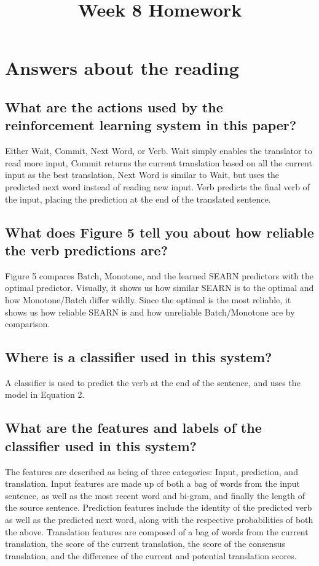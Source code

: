 \documentclass{article}
\title{Week 8 Homework}
\begin{document}
 

\section{Answers about the reading}
\subsection{What are the actions used by the reinforcement learning system in this paper?}
Either Wait, Commit, Next Word, or Verb. Wait simply enables the translator to read more input, Commit returns the current translation based on all the current input as the best translation, Next Word is similar to Wait, but uses the predicted next word instead of reading new input. Verb predicts the final verb of the input, placing the prediction at the end of the translated sentence. 

\subsection{What does Figure 5 tell you about how reliable the verb predictions are?}
Figure 5 compares Batch, Monotone, and the learned SEARN predictors with the optimal predictor. Visually, it shows us how similar SEARN is to the optimal and how Monotone/Batch differ wildly. Since the optimal is the most reliable, it shows us how reliable SEARN is and how unreliable Batch/Monotone are by comparison. 

\subsection{Where is a classifier used in this system?}
A classifier is used to predict the verb at the end of the sentence, and uses the model in Equation 2. 

\subsection{What are the features and labels of the classifier used in this system?}
The features are described as being of three categories: Input, prediction, and translation. Input features are made up of both a bag of words from the input sentence, as well as the most recent word and bi-gram, and finally the length of the source sentence. Prediction features include the identity of the predicted verb as well as the predicted next word, along with the respective probabilities of both the above. Translation features are composed of a bag of words from the current translation, the score of the current translation, the score of the consensus translation, and the difference of the current and potential translation scores. 
\end{document}
